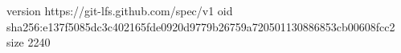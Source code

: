 version https://git-lfs.github.com/spec/v1
oid sha256:e137f5085dc3c402165fde0920d9779b26759a720501130886853cb00608fcc2
size 2240
